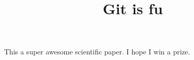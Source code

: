 \documentclass[10pt]{article}
\title{Git is fu}
\begin{document}
	\maketitle

	This a super awesome scientific paper.
	I hope I win a prize.
\end{document}
